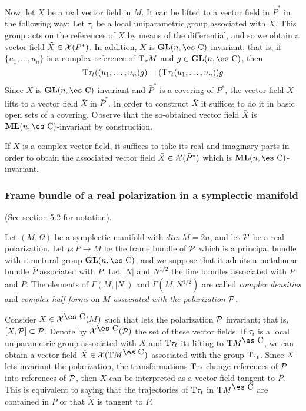 \documentclass[12pt]{article}
\theoremstyle{plain}
\def\GL{{\bf GL}(n,\Complex )}
\def\ML{{\bf ML}(n,\Complex )}
\def\Complex{\mbox{\es C}}
\def\Tan{{\rm T}}
\begin{document}
Now, let $X$ be a real vector field in $M$. It can be lifted to a vector
field in $\bar P^*$
in the following way:
Let $\tau_t$ be a local uniparametric group associated with $X$.
This group acts on the references of $X$ by means of the differential,
and so we obtain a vector field $\tilde X \in {\cal X}(P^*)$.
In addition, $\tilde X$ is $\GL$-invariant, that is, if
$\{ u_1,\ldots ,u_n \}$ is a complex reference of $\Tan_x M$ and $g \in
\GL$, then
$$
\Tan \tau_t ((u_1,\ldots ,u_n)g) = (\Tan \tau_t (u_1,\ldots ,u_n))g
$$
Since $\tilde X$ is $\GL$-invariant and $\bar P^*$ is a covering of
$P^*$,
the vector field $\tilde X$ lifts to a vector field $\bar X$ in $\bar
P^*$.
In order to construct $\bar X$ it suffices to do it in basic open sets
of a covering.
Observe that the so-obtained vector field $\bar X$ is $\ML$-invariant by
construction.

If $X$ is a complex vector field, it suffices to take its real and
imaginary parts
 in order to obtain the associated vector field
 $\bar X \in {\cal X}(\bar P^*)$
which is $\ML$-invariant.



\subsubsection{Frame bundle of a real polarization in a symplectic
manifold}

(See section 5.2 for notation).

Let $(M,\Omega )$ be a symplectic manifold with $dim\, M = 2n$,
and let ${\cal P}$ be a real polarization.
Let $p:P \to M$ be the frame bundle of ${\cal P}$
which is a principal bundle with structural group
$\GL$, and we suppose that it admits a
metalinear bundle $\bar P$ associated with $P$.
 Let $| N |$ and $N^{1/2}$ the line bundles associated with
 $P$ and $\bar P$.
The elements of $\Gamma (M,| N | )$ and $\Gamma (M,N^{1/2})$
are called {\it complex densities} and {\it complex half-forms}
on $M$ {\it associated with the polarization ${\cal P}$}.

Consider $X \in {\cal X}^{\Complex}(M)$ such that lets the polarization
${\cal P}$ invariant;
that is, $[X,{\cal P}] \subset {\cal P}$.
Denote by ${\cal X}^{\Complex}({\cal P})$ the set of these vector
fields.
If $\tau_t$ is a local uniparametric group associated with $X$ and
$\Tan \tau_t$ its lifting to $\Tan M^{\Complex}$, we can obtain a vector
field
$\tilde X \in {\cal X}(\Tan M^{\Complex})$ associated with the group
$\Tan \tau_t$.
Since $X$ lets invariant the polarization, the transformations $\Tan
\tau_t$
change references of ${\cal P}$ into references of ${\cal P}$,
then $\tilde X$ can be interpreted as a vector field tangent to $P$.
This is equivalent to saying that the trajectories of $\Tan \tau_t$ in
$\Tan M^{\Complex}$
are contained in $P$ or that $\tilde X$ is tangent to $P$.
\end{document}
